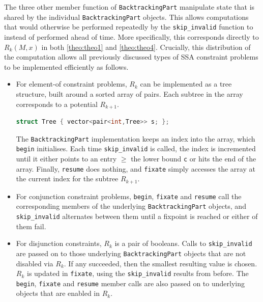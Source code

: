     The three other member function of \texttt{BacktrackingPart} manipulate
    state that is shared by the individual \texttt{BacktrackingPart} objects.
    This allows computations that would otherwise be performed repeatedly by
    the \texttt{skip\_invalid} function to instead of performed ahead of time.
    More specifically, this corresponds directly to $R_k(M,x)$ in both
    \autoref{theo:theo1} and \autoref{theo:theo4}.
    Crucially, this distribution of the computation allows all previously
    discussed types of SSA constraint problems to be implemented efficiently as
    follows.
    \begin{itemize}
    \item For element-of constraint problems, $R_k$ can be implemented as a
          tree structure, built around a sorted array of pairs.
          Each subtree in the array corresponds to a potential $R_{k+1}$.
          \begin{lstlisting}[language=C++]
struct Tree { vector<pair<int,Tree>> s; };
          \end{lstlisting}
          The \texttt{BacktrackingPart} implementation keeps an index into
          the array, which \texttt{begin} initialises.
          Each time \texttt{skip\_invalid} is called, the index is incremented
          until it either points to an entry $\geq$ the lower bound \texttt{c}
          or hits the end of the array.
          Finally, \texttt{resume} does nothing, and \texttt{fixate} simply
          accesses the array at the current index for the subtree $R_{k+1}$.
    \item For conjunction constraint problems, \texttt{begin}, \texttt{fixate}
          and \texttt{resume} call the corresponding members of the underlying
          \texttt{BacktrackingPart} objects, and \texttt{skip\_invalid}
          alternates between them until a fixpoint is reached or
          either of them fail.
    \item For disjunction constraints, $R_k$ is a pair of booleans.
          Calls to \texttt{skip\_invalid} are passed on to those underlying
          \texttt{BacktrackingPart} objects that are not disabled via $R_k$.
          If any succeeded, then the smallest resulting value is chosen.
          $R_k$ is updated in \texttt{fixate}, using the \texttt{skip\_invalid}
          results from before.
          The \texttt{begin}, \texttt{fixate} and \texttt{resume} member
          calls are also passed on to underlying objects
          that are enabled in $R_k$.
    \end{itemize}


